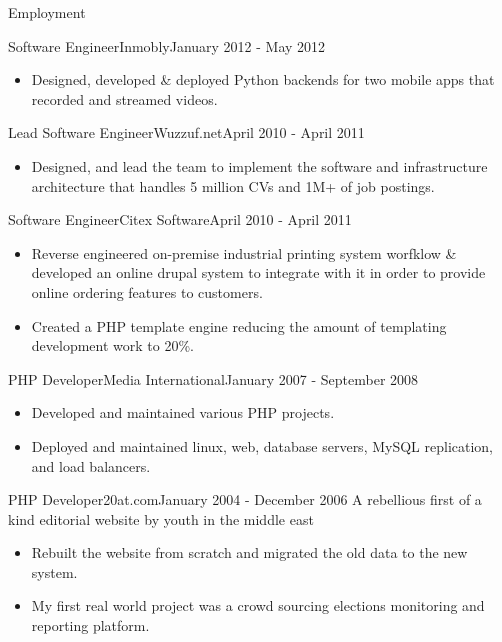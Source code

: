 \documentclass[]{mosabcv}
\begin{document}
\begin{cvsection}{Employment}
    \begin{cvsubsection}{Software Engineer}{Inmobly}{January 2012 - May 2012}
        \begin{itemize}
            \item Designed, developed \& deployed Python backends for two mobile apps that recorded and streamed videos.
        \end{itemize}
    \end{cvsubsection}
    
    \begin{cvsubsection}{Lead Software Engineer}{Wuzzuf.net}{April 2010 - April 2011}
        \begin{itemize}
            \item Designed, and lead the team to implement the software and infrastructure architecture that handles 5 million CVs and 1M+ of job postings.
        \end{itemize}
    \end{cvsubsection}
    
    \begin{cvsubsection}{Software Engineer}{Citex Software}{April 2010 - April 2011}
        \begin{itemize}
            \item Reverse engineered on-premise industrial printing system worfklow \& developed an online drupal system to integrate with it in order to provide online ordering features to customers.
            \item Created a PHP template engine reducing the amount of templating development work to 20\%.
        \end{itemize}
    \end{cvsubsection}
    
    \begin{cvsubsection}{PHP Developer}{Media International}{January 2007 - September 2008}
        \begin{itemize}
            \item Developed and maintained various PHP projects.
            \item Deployed and maintained linux, web, database servers, MySQL replication, and load balancers.
        \end{itemize}
    \end{cvsubsection}
    
    \begin{cvsubsection}{PHP Developer}{20at.com}{January 2004 - December 2006}
        A rebellious first of a kind editorial website by youth in the middle east
        \begin{itemize}
            \item Rebuilt the website from scratch and migrated the old data to the new system.
            \item My first real world project was a crowd sourcing elections monitoring and reporting platform.
        \end{itemize}
    \end{cvsubsection}
    
    \end{cvsection}
    
\end{document}
